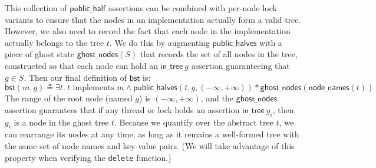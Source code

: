 \documentclass[a4paper,USenglish,cleveref, autoref, thm-restate]{lipics-v2021}
\newcommand{\treerep}{\ensuremath{\mathsf{bst}}}
\begin{document}
This collection of $\mathsf{public\_half}$ assertions can be combined with per-node lock variants to ensure that the nodes in an implementation actually form a valid tree. However, we also need to record the fact that each node in the implementation actually belongs to the tree $t$. We do this by augmenting $\mathsf{public\_halves}$ with a piece of ghost state $\mathsf{ghost\_nodes}(S)$ that records the set of all nodes in the tree, constructed so that each node can hold an $\mathsf{in\_tree}\ g$ assertion guaranteeing that $g \in S$. Then our final definition of $\treerep$ is:
$$\treerep(m, g) \triangleq \exists t.\ t \text{ implements } m \land \mathsf{public\_halves}(t, g, (-\infty, +\infty)) * \mathsf{ghost\_nodes}(\mathsf{node\_names}(t))$$
The range of the root node (named $g$) is $(-\infty, +\infty)$, and the $\mathsf{ghost\_nodes}$ assertion guarantees that if any thread or lock holds an assertion $\mathsf{in\_tree}\ g_i$, then $g_i$ is a node in the ghost tree $t$. Because we quantify over the abstract tree $t$, we can rearrange its nodes at any time, as long as it remains a well-formed tree with the same set of node names and key-value pairs. (We will take advantage of this property when verifying the \lstinline{delete} function.)
\end{document}
